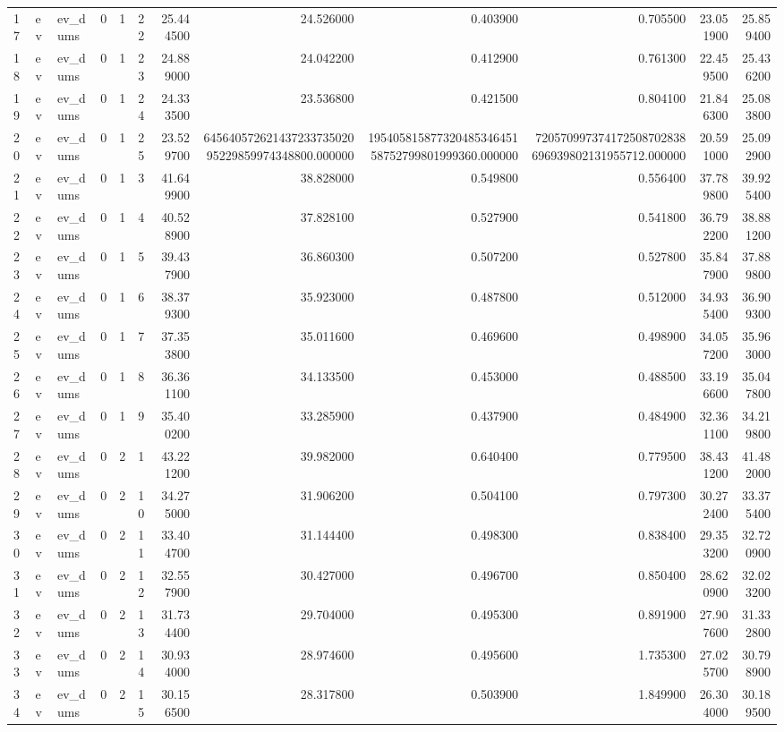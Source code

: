 \begin{tabular}{llllllrrrrrr}
17 & ev & ev_dums & 0 & 1 & 22 & 25.444500 & 24.526000 & 0.403900 & 0.705500 & 23.051900 & 25.859400 \\
18 & ev & ev_dums & 0 & 1 & 23 & 24.889000 & 24.042200 & 0.412900 & 0.761300 & 22.459500 & 25.436200 \\
19 & ev & ev_dums & 0 & 1 & 24 & 24.333500 & 23.536800 & 0.421500 & 0.804100 & 21.846300 & 25.083800 \\
20 & ev & ev_dums & 0 & 1 & 25 & 23.529700 & 64564057262143723373502095229859974348800.000000 & 19540581587732048534645158752799801999360.000000 & 720570997374172508702838696939802131955712.000000 & 20.591000 & 25.092900 \\
21 & ev & ev_dums & 0 & 1 & 3 & 41.649900 & 38.828000 & 0.549800 & 0.556400 & 37.789800 & 39.925400 \\
22 & ev & ev_dums & 0 & 1 & 4 & 40.528900 & 37.828100 & 0.527900 & 0.541800 & 36.792200 & 38.881200 \\
23 & ev & ev_dums & 0 & 1 & 5 & 39.437900 & 36.860300 & 0.507200 & 0.527800 & 35.847900 & 37.889800 \\
24 & ev & ev_dums & 0 & 1 & 6 & 38.379300 & 35.923000 & 0.487800 & 0.512000 & 34.935400 & 36.909300 \\
25 & ev & ev_dums & 0 & 1 & 7 & 37.353800 & 35.011600 & 0.469600 & 0.498900 & 34.057200 & 35.963000 \\
26 & ev & ev_dums & 0 & 1 & 8 & 36.361100 & 34.133500 & 0.453000 & 0.488500 & 33.196600 & 35.047800 \\
27 & ev & ev_dums & 0 & 1 & 9 & 35.400200 & 33.285900 & 0.437900 & 0.484900 & 32.361100 & 34.219800 \\
28 & ev & ev_dums & 0 & 2 & 1 & 43.221200 & 39.982000 & 0.640400 & 0.779500 & 38.431200 & 41.482000 \\
29 & ev & ev_dums & 0 & 2 & 10 & 34.275000 & 31.906200 & 0.504100 & 0.797300 & 30.272400 & 33.375400 \\
30 & ev & ev_dums & 0 & 2 & 11 & 33.404700 & 31.144400 & 0.498300 & 0.838400 & 29.353200 & 32.720900 \\
31 & ev & ev_dums & 0 & 2 & 12 & 32.557900 & 30.427000 & 0.496700 & 0.850400 & 28.620900 & 32.023200 \\
32 & ev & ev_dums & 0 & 2 & 13 & 31.734400 & 29.704000 & 0.495300 & 0.891900 & 27.907600 & 31.332800 \\
33 & ev & ev_dums & 0 & 2 & 14 & 30.934000 & 28.974600 & 0.495600 & 1.735300 & 27.025700 & 30.798900 \\
34 & ev & ev_dums & 0 & 2 & 15 & 30.156500 & 28.317800 & 0.503900 & 1.849900 & 26.304000 & 30.189500 \\

\end{tabular}
